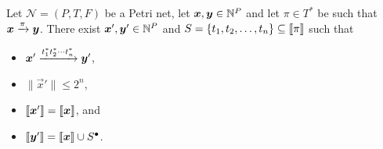 \newcommand{\pn}{\mathcal{N}}
\newcommand{\norm}[1]{\lVert#1\rVert}
\newcommand{\pre}[1]{\ensuremath{{^\bullet #1}}}
\newcommand{\post}[1]{\ensuremath{{#1^\bullet}}}
\newcommand{\prepost}[1]{\ensuremath{{^\bullet {#1} ^\bullet}}}

\begin{theorem}
  Let $\pn = (P, T, F)$ be a Petri net, let $\bm{x}, \bm{y} \in
  \mathbb{N}^P$ and let $\pi \in T^*$ be such that $\bm{x} \xrightarrow{\pi}
  \bm{y}$. There exist $\bm{x}', \bm{y}' \in \mathbb{N}^P$ and $S = \{t_1,
  t_2, \ldots, t_n\} \subseteq \llbracket\pi\rrbracket$ such that
  \begin{itemize}
  \item $\bm{x}' \xrightarrow{t_1^* t_2^* \cdots t_n^*} \bm{y}'$,

  \item $\norm{\vec{x}'} \leq 2^n$,

  \item $\llbracket\bm{x}'\rrbracket = \llbracket\bm{x}\rrbracket$, and 

  \item $\supp{\vec{y}'} = \supp{\vec{x}} \cup \post{S}$.
  \end{itemize}
\end{theorem}

